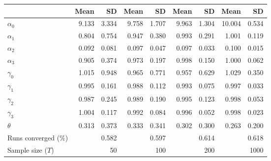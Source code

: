
\begin{tabular}[t]{lrrrrrrrr}
\toprule
  & Mean & SD & Mean  & SD  & Mean   & SD   & Mean    & SD   \\
\midrule
$\alpha_{0}$ & 9.133 & 3.334 & 9.758 & 1.707 & 9.963 & 1.304 & 10.004 & 0.534\\
$\alpha_{1}$ & 0.804 & 0.754 & 0.947 & 0.380 & 0.993 & 0.291 & 1.001 & 0.119\\
$\alpha_{2}$ & 0.092 & 0.081 & 0.097 & 0.047 & 0.097 & 0.033 & 0.100 & 0.015\\
$\alpha_{3}$ & 0.905 & 0.374 & 0.973 & 0.197 & 0.998 & 0.150 & 1.000 & 0.062\\
$\gamma_{0}$ & 1.015 & 0.948 & 0.965 & 0.771 & 0.957 & 0.629 & 1.029 & 0.350\\
$\gamma_{1}$ & 0.995 & 0.161 & 0.988 & 0.112 & 0.993 & 0.075 & 0.997 & 0.033\\
$\gamma_{2}$ & 0.987 & 0.245 & 0.989 & 0.190 & 0.995 & 0.123 & 0.998 & 0.053\\
$\gamma_{3}$ & 1.004 & 0.117 & 0.992 & 0.084 & 0.996 & 0.052 & 0.998 & 0.023\\
$\theta$ & 0.313 & 0.373 & 0.333 & 0.341 & 0.302 & 0.300 & 0.263 & 0.200\\
Runs converged (\%) &  & 0.582 &  & 0.597 &  & 0.614 &  & 0.618\\
Sample size ($T$) &  & 50 &  & 100 &  & 200 &  & 1000\\
\bottomrule
\end{tabular}
